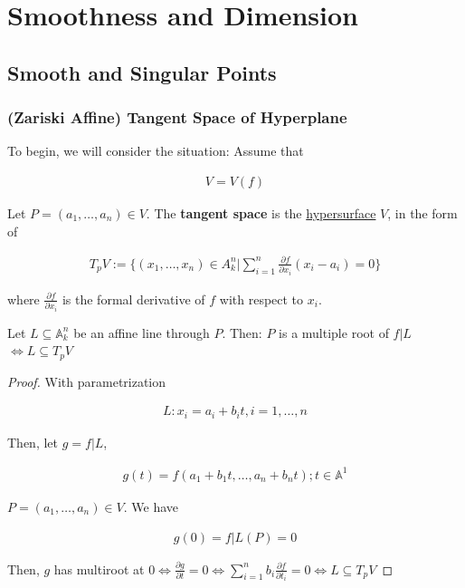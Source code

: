 \documentclass[Total.tex]{subfiles}
\begin{document}
		\section{Smoothness and Dimension}
		
			\subsection{Smooth and Singular Points}
			
				\subsubsection{(Zariski Affine) Tangent Space of Hyperplane}
				
					\begin{Def}
						To begin, we will consider the situation: Assume that 
						
						\begin{gather*}
							V=V(f)
						\end{gather*}
						
						Let $P=(a_1,\dots,a_n)\in V$. The \textbf{tangent space} is the \underline{hypersurface} $V$, in the form of 
						
						\begin{gather*}
							T_pV:=\{(x_1,\dots,x_n)\in A^n_k|\sum_{i=1}^n \frac{\partial f}{\partial x_i}(x_i-a_i)=0\}
						\end{gather*}
						
						where $\frac{\partial f}{\partial x_i}$ is the formal derivative of $f$ with respect to $x_i$.
					\end{Def}
					
					
					
					\begin{lemma}
						Let $L\subseteq \mathbb{A}^n_k$ be an affine line through $P$. Then: $P$ is a multiple root of $f|L$ $\Leftrightarrow L\subseteq T_p V$ 
					\end{lemma}
					
					\begin{proof}
						With parametrization
						
						\begin{gather*}
							L:x_i=a_i+b_it,i=1,\dots,n
						\end{gather*}
						
						Then, let $g=f|L$,
						
						\begin{gather*}
							g(t)=f(a_1+b_1t,\dots,a_n+b_nt);t\in \mathbb{A}^1
						\end{gather*}
						
						$P=(a_1,\dots,a_n)\in V$. We have
						
						\begin{gather*}
							g(0)=f|L(P)=0
						\end{gather*}
						
						Then, $g$ has multiroot at $0\Leftrightarrow \frac{\partial g}{\partial t}=0\Leftrightarrow \sum_{i=1}^n b_i \frac{\partial f}{\partial t_i}=0\Leftrightarrow L\subseteq T_p V$
					\end{proof}
					
\end{document}
